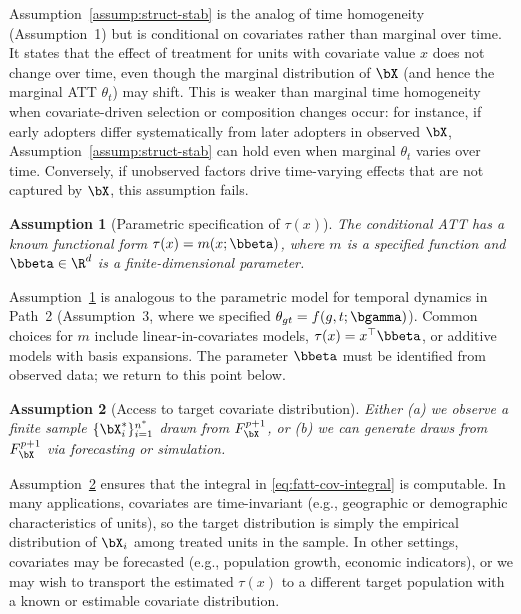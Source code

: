 \documentclass{article}
\newtheorem{assumption}{Assumption}
\begin{document}
Assumption~\ref{assump:struct-stab} is the analog of time homogeneity (Assumption~1) but is conditional on covariates rather than marginal over time. It states that the effect of treatment for units with covariate value $x$ does not change over time, even though the marginal distribution of $\bX$ (and hence the marginal ATT $\theta_t$) may shift. This is weaker than marginal time homogeneity when covariate-driven selection or composition changes occur: for instance, if early adopters differ systematically from later adopters in observed $\bX$, Assumption~\ref{assump:struct-stab} can hold even when marginal $\theta_t$ varies over time. Conversely, if unobserved factors drive time-varying effects that are not captured by $\bX$, this assumption fails.

\begin{assumption}[Parametric specification of $\tau(x)$]\label{assump:param-tau}
The conditional ATT has a known functional form $\tau(x) = m(x; \bbeta)$, where $m$ is a specified function and $\bbeta \in \R^d$ is a finite-dimensional parameter.
\end{assumption}

Assumption~\ref{assump:param-tau} is analogous to the parametric model for temporal dynamics in Path~2 (Assumption~3, where we specified $\theta_{gt} = f(g,t;\bgamma)$). Common choices for $m$ include linear-in-covariates models, $\tau(x) = x^\top \bbeta$, or additive models with basis expansions. The parameter $\bbeta$ must be identified from observed data; we return to this point below.

\begin{assumption}[Access to target covariate distribution]\label{assump:target-dist}
Either (a) we observe a finite sample $\{\bX_i^*\}_{i=1}^{n^*}$ drawn from $F_{\bX}^{p+1}$, or (b) we can generate draws from $F_{\bX}^{p+1}$ via forecasting or simulation.
\end{assumption}

Assumption~\ref{assump:target-dist} ensures that the integral in \eqref{eq:fatt-cov-integral} is computable. In many applications, covariates are time-invariant (e.g., geographic or demographic characteristics of units), so the target distribution is simply the empirical distribution of $\bX_i$ among treated units in the sample. In other settings, covariates may be forecasted (e.g., population growth, economic indicators), or we may wish to transport the estimated $\tau(x)$ to a different target population with a known or estimable covariate distribution.
\end{document}
